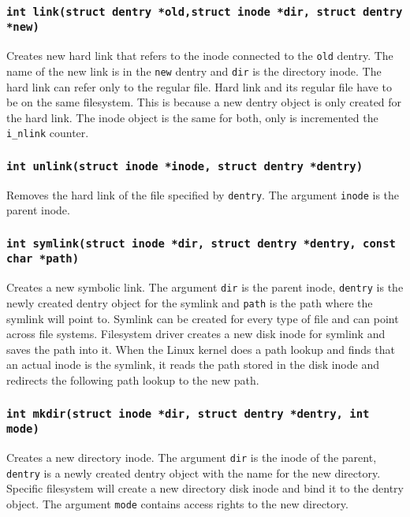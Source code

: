 \subsubsection{\texttt{int link(struct dentry *old,struct inode *dir, struct dentry
*new)}}

Creates new hard link that refers to the inode connected to the \texttt{old} dentry.
The name of the new link is in the \texttt{new} dentry and \texttt{dir} is the
directory inode. The hard
link can refer only to the regular file. Hard link and its regular file have to be on the
same filesystem. This is because a new dentry object is only created for the hard
link. The inode object is the same for both, only is incremented the \texttt{i\_nlink} counter.

\subsubsection{\texttt{int unlink(struct inode *inode, struct dentry *dentry)}}

Removes the hard link of the file specified by \texttt{dentry}. The argument
\texttt{inode} is the parent inode.

\subsubsection{\texttt{int symlink(struct inode *dir, struct dentry *dentry, const char
*path)}}

Creates a new symbolic link. The argument \texttt{dir} is the parent inode,
\texttt{dentry} is the newly
created dentry object for the symlink and \texttt{path} is the path where the symlink will
point to. Symlink can be created for every type of file and can point across file
systems. Filesystem driver creates a new disk inode for symlink and saves the path
into it. When the Linux kernel does a path lookup and finds that an actual inode is the symlink, it
reads the path stored in the disk inode and redirects the following path lookup to the new path.

\subsubsection{\texttt{int mkdir(struct inode *dir, struct dentry *dentry, int mode)}}

Creates a new directory inode. The argument \texttt{dir} is the inode of the parent,
\texttt{dentry} is a newly created dentry object with the name for the new directory. Specific
filesystem will create a new directory disk inode and bind it to the dentry object.
The argument \texttt{mode} contains access rights to the new directory.

